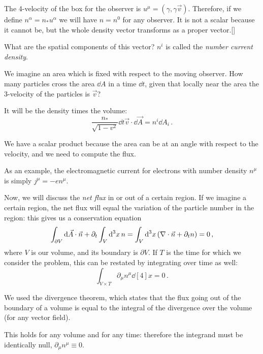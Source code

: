 \documentclass[main.tex]{subfiles}
\begin{document}
The 4-velocity of the box for the observer is \(u^{\mu }= (\gamma , \gamma \vec{v})\). Therefore, if we define \(n^{\alpha }= n_{*} u^{\alpha }\) we will have \(n = n^{0}\) for any observer.
It is not a scalar because it cannot be, but the whole density vector transforms as a proper vector.[]

What are the spatial components of this vector? \(n^{i}\)   is called the \emph{number current density}.

We imagine an area which is fixed with respect to the moving observer. How many particles cross the area \(\dd{A} \) in a time \(\dd{t}\), given that locally near the area the 3-velocity of the particles is \(\vec{v}\)?

It will be the density times the volume: 
%
\begin{equation}
  \frac{n_{*}}{\sqrt{1-v^2} } \dd{t} \vec{v} \cdot \dd{\vec{A}} = n^{i} \dd{A_{i}} 
\,.
\end{equation}
%

We have a scalar product because the area can be at an angle with respect to the velocity, and we need to compute the flux.

As an example, the electromagnetic current for electrons with number density \(n^{\mu }\) is simply \(j^{\mu } = -e n^{\mu }\).

Now, we will discuss the \emph{net flux} in or out of a certain region. If we imagine a certain region, the net flux will equal the variation of the particle number in the region: this gives us a conservation equation 
%
\begin{equation}
  \int _{\partial V} \dd{\vec{A}} \cdot \vec{n} + \partial_{t} \int _{V} \dd[3]{x} n 
  = \int _{V} \dd[3]{x} \qty(\nabla \cdot \vec{n} + \partial_t n) 
  = 0
\,,
\end{equation}
%
where \(V\) is our volume, and its boundary is \(\partial V\). If \(T\) is the time for which we consider the problem, this can be restated by integrating over time as well: 
%
\begin{equation}
    \int _{V \times T} \partial_{\mu } n^{\mu } \dd[4]{x} 
  = 0
\,.
\end{equation}
%

We used the divergence theorem, which states that the flux going out of the boundary of a volume is equal to the integral of the divergence over the volume (for any vector field).

This holds for any volume and for any time: therefore the integrand must be identically null, \(\partial_{\mu }n^{\mu }\equiv 0\).
\end{document}

